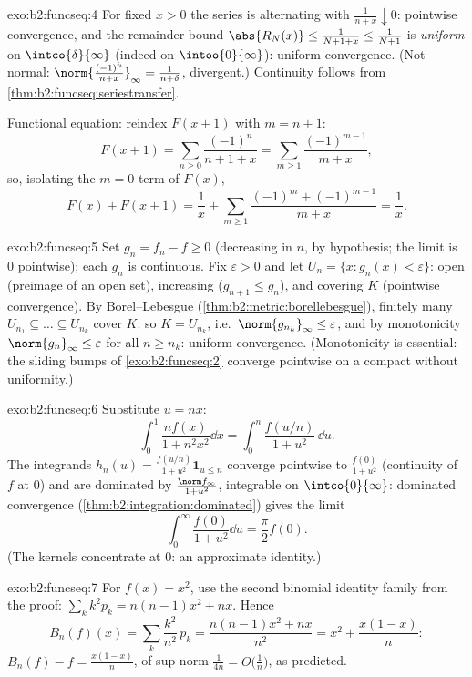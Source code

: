 \begin{solution}{exo:b2:funcseq:4}
For fixed $x > 0$ the series is alternating with $\frac{1}{n + x}
\downarrow 0$: pointwise convergence, and the remainder bound
$\abs{R_N(x)} \leq \frac{1}{N + 1 + x} \leq \frac{1}{N+1}$ is
\emph{uniform} on $\intco{\delta}{\infty}$ (indeed on
$\intoo{0}{\infty}$): uniform convergence. (Not normal:
$\norm{\frac{(-1)^n}{n+x}}_\infty = \frac{1}{n + \delta}$,
divergent.) Continuity follows from
\cref{thm:b2:funcseq:seriestransfer}.

Functional equation: reindex $F(x + 1)$ with $m = n + 1$:
\[
F(x+1) = \sum_{n\geq0} \frac{(-1)^n}{n + 1 + x}
= \sum_{m\geq1}\frac{(-1)^{m-1}}{m+x} ,
\]
so, isolating the $m = 0$ term of $F(x)$,
\[
F(x) + F(x+1)
= \frac{1}{x} + \sum_{m\geq1}
\frac{(-1)^m + (-1)^{m-1}}{m+x} = \frac1x .
\]
\end{solution}

\begin{solution}{exo:b2:funcseq:5}
Set $g_n = f_n - f \geq 0$ (decreasing in $n$, by hypothesis; the
limit is $0$ pointwise); each $g_n$ is continuous. Fix $\varepsilon
> 0$ and let $U_n = \{x : g_n(x) < \varepsilon\}$: open (preimage
of an open set), increasing ($g_{n+1} \leq g_n$), and covering $K$
(pointwise convergence). By Borel--Lebesgue
(\cref{thm:b2:metric:borellebesgue}), finitely many $U_{n_1}
\subseteq \dots \subseteq U_{n_k}$ cover $K$: so $K = U_{n_k}$,
i.e.\ $\norm{g_{n_k}}_\infty \leq \varepsilon$, and by monotonicity
$\norm{g_n}_\infty \leq \varepsilon$ for all $n \geq n_k$: uniform
convergence. (Monotonicity is essential: the sliding bumps of
\cref{exo:b2:funcseq:2} converge pointwise on a compact without
uniformity.)
\end{solution}

\begin{solution}{exo:b2:funcseq:6}
Substitute $u = nx$:
\[
\int_0^1 \frac{n f(x)}{1 + n^2x^2}\dd x
= \int_0^n \frac{f(u/n)}{1 + u^2}\,\dd u .
\]
The integrands $h_n(u) = \frac{f(u/n)}{1+u^2}\mathbf{1}_{u \leq n}$
converge pointwise to $\frac{f(0)}{1+u^2}$ (continuity of $f$ at
$0$) and are dominated by $\frac{\norm f_\infty}{1 + u^2}$,
integrable on $\intco{0}{\infty}$: dominated convergence
(\cref{thm:b2:integration:dominated}) gives the limit
\[
\int_0^\infty \frac{f(0)}{1 + u^2}\dd u = \frac{\pi}{2} f(0) .
\]
(The kernels concentrate at $0$: an approximate identity.)
\end{solution}

\begin{solution}{exo:b2:funcseq:7}
For $f(x) = x^2$, use the second binomial identity family from the
proof: $\sum_k k^2 p_k = n(n-1)x^2 + nx$. Hence
\[
B_n(f)(x) = \sum_k \frac{k^2}{n^2}\,p_k
= \frac{n(n-1)x^2 + nx}{n^2}
= x^2 + \frac{x(1 - x)}{n} :
\]
$B_n(f) - f = \frac{x(1-x)}{n}$, of sup norm $\frac{1}{4n} =
O\bigl(\frac1n\bigr)$, as predicted.
\end{solution}

